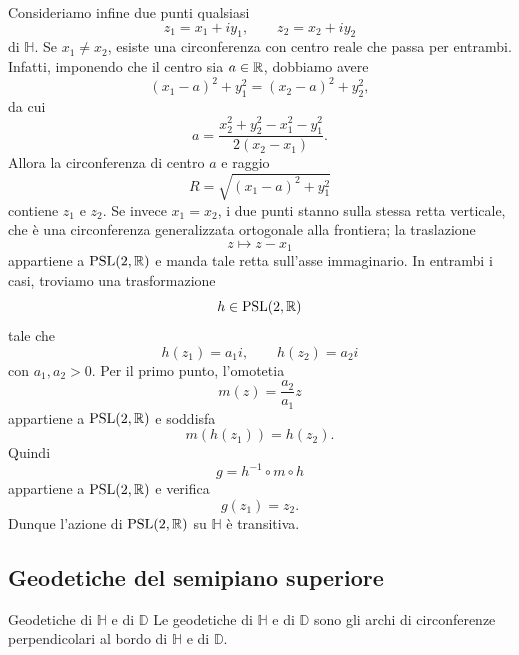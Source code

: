 \documentclass[a4paper]{article}
\begin{document}
\begin{snippetproof}{}
    Consideriamo infine due punti qualsiasi
    \[
        z_1=x_1+iy_1,
        \qquad
        z_2=x_2+iy_2
    \]
    di \(\mathbb{H}\). Se \(x_1\neq x_2\), esiste una circonferenza con centro reale che passa per entrambi. Infatti, imponendo che il centro sia \(a\in\mathbb{R}\), dobbiamo avere
    \[
        (x_1-a)^2+y_1^2=(x_2-a)^2+y_2^2,
    \]
    da cui
    \[
        a=
        \frac{x_2^2+y_2^2-x_1^2-y_1^2}{2(x_2-x_1)}.
    \]
    Allora la circonferenza di centro \(a\) e raggio
    \[
        R=\sqrt{(x_1-a)^2+y_1^2}
    \]
    contiene \(z_1\) e \(z_2\). Se invece \(x_1=x_2\), i due punti stanno sulla stessa retta verticale, che è una circonferenza generalizzata ortogonale alla frontiera; la traslazione
    \[
        z\longmapsto z-x_1
    \]
    appartiene a \(\operatorname{PSL}(2,\mathbb{R})\) e manda tale retta sull'asse immaginario.
    In entrambi i casi, troviamo una trasformazione
    \[
        h\in\operatorname{PSL}(2,\mathbb{R})
    \]
    tale che
    \[
        h(z_1)=a_1i,
        \qquad
        h(z_2)=a_2i
    \]
    con \(a_1,a_2>0\). Per il primo punto, l'omotetia
    \[
        m(z)=\frac{a_2}{a_1}z
    \]
    appartiene a \(\operatorname{PSL}(2,\mathbb{R})\) e soddisfa
    \[
        m(h(z_1))=h(z_2).
    \]
    Quindi
    \[
        g=h^{-1}\circ m\circ h
    \]
    appartiene a \(\operatorname{PSL}(2,\mathbb{R})\) e verifica
    \[
        g(z_1)=z_2.
    \]
    Dunque l'azione di \(\operatorname{PSL}(2,\mathbb{R})\) su \(\mathbb{H}\) è transitiva.
\end{snippetproof}

\subsection{Geodetiche del semipiano superiore}

\begin{snippetproposition}{Geodetiche di \(\mathbb{H}\) e di \(\mathbb{D}\)}
    Le geodetiche di \(\mathbb{H}\) e di \(\mathbb{D}\) sono gli archi di circonferenze
    perpendicolari al bordo di \(\mathbb{H}\) e di \(\mathbb{D}\).
\end{snippetproposition}
\end{document}
